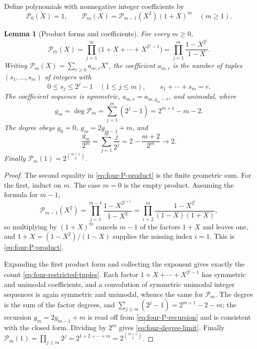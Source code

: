 \documentclass[11pt,oneside]{article}
\newtheorem{lemma}[theorem]{Lemma}
\theoremstyle{definition}
\theoremstyle{remark}
\begin{document}
Define polynomials with nonnegative integer coefficients by
\begin{equation}
 \mathcal P_0(X)=1,
 \qquad
 \mathcal P_m(X)=\mathcal P_{m-1}(X^2)(1+X)^m\quad(m\ge1). \label{eq:four-P-recursion}
\end{equation}

\begin{lemma}[Product forms and coefficients]
\label{lem:four-P-product}
For every $m\ge0$,
\begin{equation}
 \mathcal P_m(X)
 =\prod_{j=1}^{m}\bigl(1+X+\cdots+X^{2^j-1}\bigr)
 =\prod_{j=1}^{m}\frac{1-X^{2^j}}{1-X}.                   \label{eq:four-P-product}
\end{equation}
Writing $\mathcal P_m(X)=\sum_{r\ge0}a_{m,r}X^r$, the coefficient $a_{m,r}$ is the number of
tuples $(s_1,\dots,s_m)$ of integers with
\begin{equation}
 0\le s_j\le 2^j-1\quad(1\le j\le m),
 \qquad s_1+\cdots+s_m=r.                                 \label{eq:four-restricted-tuples}
\end{equation}
The coefficient sequence is symmetric, $a_{m,r}=a_{m,g_m-r}$, and unimodal, where
\begin{equation}
 g_m=\deg\mathcal P_m=\sum_{j=1}^{m}(2^j-1)=2^{m+1}-m-2.   \label{eq:four-degree}
\end{equation}
The degree obeys $g_0=0$, $g_m=2g_{m-1}+m$, and
\begin{equation}
 \frac{g_m}{2^m}=\sum_{j=1}^{m}\frac{j}{2^j}
 =2-\frac{m+2}{2^m}\longrightarrow 2.                     \label{eq:four-degree-limit}
\end{equation}
Finally $\mathcal P_m(1)=2^{\binom{m+1}{2}}$.
\end{lemma}

\begin{proof}
The second equality in \eqref{eq:four-P-product} is the finite geometric sum.  For the first,
induct on $m$.  The case $m=0$ is the empty product.  Assuming the formula for $m-1$,
\begin{equation*}
 \mathcal P_{m-1}(X^2)
 =\prod_{j=1}^{m-1}\frac{1-X^{2^{j+1}}}{1-X^2}
 =\prod_{i=2}^{m}\frac{1-X^{2^{i}}}{(1-X)(1+X)},
\end{equation*}
so multiplying by $(1+X)^m$ cancels $m-1$ of the factors $1+X$ and leaves one, and
$1+X=(1-X^2)/(1-X)$ supplies the missing index $i=1$.  This is \eqref{eq:four-P-product}.

Expanding the first product form and collecting the exponent gives exactly the count
\eqref{eq:four-restricted-tuples}.  Each factor $1+X+\cdots+X^{2^j-1}$ has symmetric and
unimodal coefficients, and a convolution of symmetric unimodal integer sequences is again
symmetric and unimodal, whence the same for $\mathcal P_m$.  The degree is the sum of the
factor degrees, and $\sum_{j\le m}(2^j-1)=2^{m+1}-2-m$; the recursion $g_m=2g_{m-1}+m$ is
read off from \eqref{eq:four-P-recursion} and is consistent with the closed form.  Dividing
by $2^m$ gives \eqref{eq:four-degree-limit}.  Finally
$\mathcal P_m(1)=\prod_{j\le m}2^j=2^{1+2+\cdots+m}=2^{\binom{m+1}{2}}$.
\end{proof}
\end{document}
